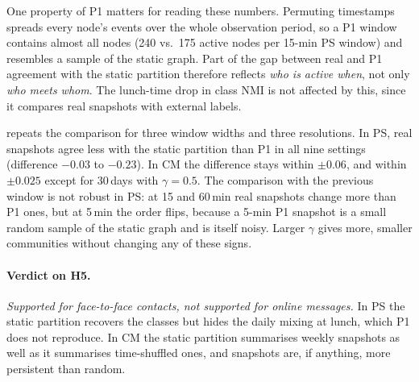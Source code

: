One property of P1 matters for reading these numbers. Permuting timestamps spreads every
node's events over the whole observation period, so a P1 window contains almost all nodes
(240 vs.\ 175 active nodes per 15-min PS window) and resembles a sample of the static
graph. Part of the gap between real and P1 agreement with the static partition therefore
reflects \emph{who is active when}, not only \emph{who meets whom}. The lunch-time drop
in class NMI is not affected by this, since it compares real snapshots with external
labels.

 repeats the comparison for three window widths and three resolutions.
In PS, real snapshots agree less with the static partition than P1 in all nine settings
(difference $-0.03$ to $-0.23$). In CM the difference stays within $\pm0.06$, and within
$\pm0.025$ except for 30\,days with $\gamma=0.5$. The comparison with the previous window
is not robust in PS: at 15 and 60\,min real snapshots change more than P1 ones, but at
5\,min the order flips, because a 5-min P1 snapshot is a small random sample of the static
graph and is itself noisy. Larger $\gamma$ gives more, smaller communities without changing
any of these signs.

\paragraph{Verdict on H5.}
\emph{Supported for face-to-face contacts, not supported for online messages.} In PS the
static partition recovers the classes but hides the daily mixing at lunch, which P1 does
not reproduce. In CM the static partition summarises weekly snapshots as well as it
summarises time-shuffled ones, and snapshots are, if anything, more persistent than random.

